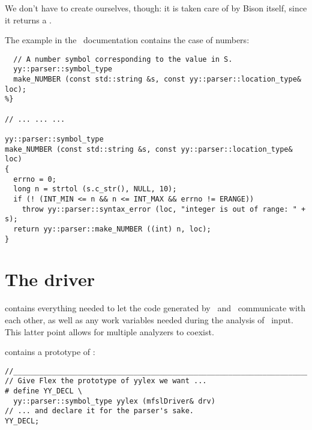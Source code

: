 We don't have to create  ourselves, though: it is taken care of by Bison itself, since it returns a .

The  example in the \bison\ documentation contains the case of numbers:
\begin{lstlisting}[language=Flex]
%{
  // A number symbol corresponding to the value in S.
  yy::parser::symbol_type
  make_NUMBER (const std::string &s, const yy::parser::location_type& loc);
%}

// ... ... ...

yy::parser::symbol_type
make_NUMBER (const std::string &s, const yy::parser::location_type& loc)
{
  errno = 0;
  long n = strtol (s.c_str(), NULL, 10);
  if (! (INT_MIN <= n && n <= INT_MAX && errno != ERANGE))
    throw yy::parser::syntax_error (loc, "integer is out of range: " + s);
  return yy::parser::make_NUMBER ((int) n, loc);
}
\end{lstlisting}


\section{The driver}

 contains everything needed to let the code generated by \flex\ and \bison\ communicate with each other, as well as any work variables needed during the analysis of \mfslLang\ input.
This latter point allows for multiple analyzers to coexist.

 contains a prototype of :
\begin{lstlisting}[language=CPlusPlus]
//______________________________________________________________________________
// Give Flex the prototype of yylex we want ...
# define YY_DECL \
  yy::parser::symbol_type yylex (mfslDriver& drv)
// ... and declare it for the parser's sake.
YY_DECL;
\end{lstlisting}

